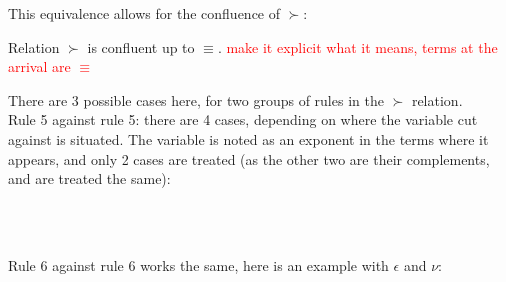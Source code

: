 This equivalence allows for the confluence of $\succ$:

\begin{proposition}
Relation $\succ$ is confluent up to $\equiv$. \textcolor{red}{make it explicit what it means, \ie terms at the arrival are $\equiv$} %
\end{proposition}

\begin{myproof}
There are 3 possible cases here, for two groups of rules in the $\succ$ relation.\\
Rule 5 against rule 5: there are 4 cases, depending on where the variable cut against is situated. The variable is noted as an exponent in the terms where it appears, and only 2 cases are treated (as the other two are their complements, and are treated the same):\\
\\
\\
Rule 6 against rule 6 works the same, here is an example with $\epsilon$ and $\nu$:\\
\\~\\

\end{myproof}

